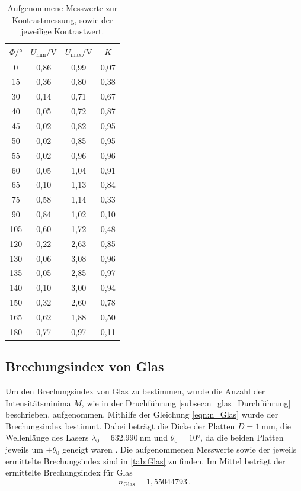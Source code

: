\begin{table}[H]
  \centering
  \caption{Aufgenommene Messwerte zur Kontrastmessung, sowie der jeweilige Kontrastwert.}
  \label{tab:Kontrast}
  \begin{tabular}{c c c c}
    \toprule
    $\Phi / \si{\degree} $ & $U_{\text{min}} / \si{\volt}$ & $U_{\text{max}} / \si{\volt}$ & $K$ \\
    \midrule
    0     &  0,86  &  0,99  & 0,07  \\
    15    &  0,36  &  0,80  & 0,38  \\
    30    &  0,14  &  0,71  & 0,67  \\
    40    &  0,05  &  0,72  & 0,87  \\
    45    &  0,02  &  0,82  & 0,95  \\
    50    &  0,02  &  0,85  & 0,95  \\
    55    &  0,02  &  0,96  & 0,96  \\
    60    &  0,05  &  1,04  & 0,91  \\
    65    &  0,10  &  1,13  & 0,84  \\
    75    &  0,58  &  1,14  & 0,33  \\
    90    &  0,84  &  1,02  & 0,10  \\
    105   &  0,60  &  1,72  & 0,48  \\
    120   &  0,22  &  2,63  & 0,85  \\
    130   &  0,06  &  3,08  & 0,96  \\
    135   &  0,05  &  2,85  & 0,97  \\
    140   &  0,10  &  3,00  & 0,94  \\
    150   &  0,32  &  2,60  & 0,78  \\
    165   &  0,62  &  1,88  & 0,50  \\
    180   &  0,77  &  0,97  & 0,11  \\
    \bottomrule
  \end{tabular}
\end{table}

\subsection{Brechungsindex von Glas}
\label{subsec:n_Glas}
Um den Brechungsindex von Glas zu bestimmen, wurde die Anzahl der Intensitätsminima $M$, wie in der Druchführung \ref{subsec:n_glas_Durchführung} beschrieben, aufgenommen.
Mithilfe der Gleichung \eqref{eqn:n_Glas} wurde der Brechungsindex bestimmt.
Dabei beträgt die Dicke der Platten $D = \SI{1}{\milli\metre}$, die Wellenlänge des Lasers $\lambda_0 = \SI{632.990}{\nano\metre}$ und $\theta_0 = 10°$, da die beiden Platten jeweils um $\pm \theta_0$ geneigt waren \cite{anleitung}.
Die aufgenommenen Messwerte sowie der jeweils ermittelte Brechungsindex sind in \autoref{tab:Glas} zu finden.
Im Mittel beträgt der ermittelte Brechungsindex für Glas 
\begin{equation*}
    n_\text{Glas} = 1,55044793 \,.
\end{equation*}

